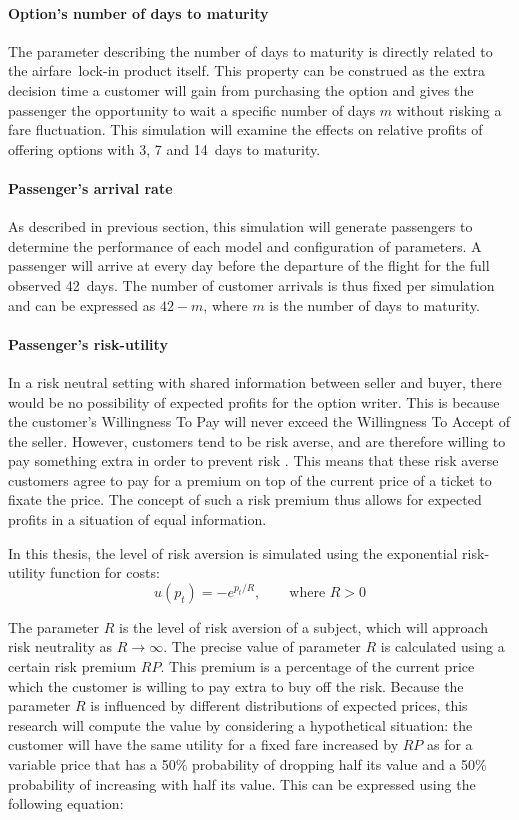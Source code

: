 \paragraph{Option's number of days to maturity}
The parameter describing the number of days to maturity is directly related to the airfare~lock-in product itself. This property can be construed as the extra decision time a customer will gain from purchasing the option and gives the passenger the opportunity to wait a specific number of days $m$ without risking a fare fluctuation. This simulation will examine the effects on relative profits of offering options with 3, 7 and 14~days to maturity.


\paragraph{Passenger's arrival rate}
As described in previous section, this simulation will generate passengers to determine the performance of each model and configuration of parameters. A passenger will arrive at every day before the departure of the flight for the full observed 42~days. The number of customer arrivals is thus fixed per simulation and can be expressed as $42 - m$, where $m$ is the number of days to maturity.

\paragraph{Passenger's risk-utility}
In a risk neutral setting with shared information between seller and buyer, there would be no possibility of expected profits for the option writer. This is because the customer's Willingness To Pay will never exceed the Willingness To Accept of the seller. However, customers tend to be risk averse, and are therefore willing to pay something extra in order to prevent risk . This means that these risk averse customers agree to pay for a premium on top of the current price of a ticket to fixate the price. The concept of such a risk premium thus allows for expected profits in a situation of equal information.

In this thesis, the level of risk aversion is simulated using the exponential risk-utility function for costs:
$$
u(p_t) = -e^{p_t/R},\hspace{2em}\text{where } R > 0
$$

The parameter $R$ is the level of risk aversion of a subject, which will approach risk neutrality as $R \rightarrow \infty$. The precise value of parameter $R$ is calculated using a certain risk premium $RP$. This premium is a percentage of the current price which the customer is willing to pay extra to buy off the risk. Because the parameter $R$ is influenced by different distributions of expected prices, this research will compute the value by considering a hypothetical situation: the customer will have the same utility for a fixed fare increased by $RP$ as for a variable price that has a 50\% probability of dropping half its value and a 50\% probability of increasing with half its value. This can be expressed using the following equation: 

